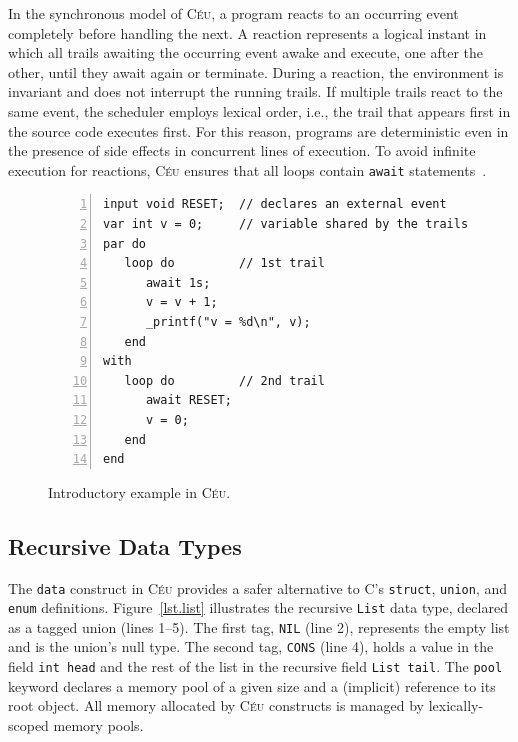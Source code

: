 \documentclass{sig-alternate}
\newcommand{\CEU}{\textsc{C\'{e}u}\xspace}
\newcommand{\code}[1] {{\small{\texttt{#1}}}}
\begin{document}
In the synchronous model of \CEU, a program reacts to an occurring event 
completely before handling the next.
%
A reaction represents a logical instant in which all trails awaiting the 
occurring event awake and execute, one after the other, until they await again 
or terminate.
%
During a reaction, the environment is invariant and does not interrupt the 
running trails.
If multiple trails react to the same event, the scheduler employs lexical 
order, i.e., the trail that appears first in the source code executes first.
%
For this reason, programs are deterministic even in the presence of side 
effects in concurrent lines of execution.
%
To avoid infinite execution for reactions, \CEU ensures that all loops contain 
\code{await} statements~\cite{ceu.sensys13}.

\begin{figure}[t]
\begin{lstlisting}[numbers=left,xleftmargin=3em]
input void RESET;  // declares an external event
var int v = 0;     // variable shared by the trails
par do
   loop do         // 1st trail
      await 1s;
      v = v + 1;
      _printf("v = %d\n", v);
   end
with
   loop do         // 2nd trail
      await RESET;
      v = 0;
   end
end
\end{lstlisting}
\caption{ Introductory example in \CEU.
\label{lst.intro}
}
\end{figure}

\subsection{Recursive Data Types}

The \code{data} construct in \CEU provides a safer alternative to C's
\code{struct}, \code{union}, and \code{enum} definitions.
%
Figure~\ref{lst.list} illustrates the recursive \code{List} data type,
declared as a tagged union (lines 1--5).
The first tag, \code{NIL} (line 2), represents the empty list and is the 
union's null type.
The second tag, \code{CONS} (line 4), holds a value in the field \code{int 
head} and the rest of the list in the recursive field \code{List tail}.
%
The \code{pool} keyword declares a memory pool of a given size and
a (implicit) reference to its root object.
All memory allocated by \CEU constructs is managed by lexically-scoped memory
pools.
\end{document}
